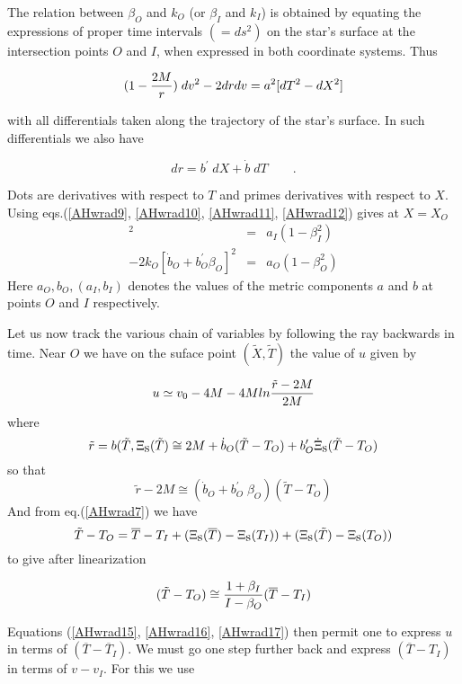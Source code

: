 \documentclass[12pt,oneside]{report}
\def\beq {\begin{equation}}
\def\feq {\end{equation}}
\begin{document}
The relation between $ \beta_O $ and $ k_O$ (or $ \beta_I $
and $ k_I$) is obtained by equating the expressions  of proper time intervals
$(= ds^2)$  on the star's surface at the intersection
points $O$ and $I$, when expressed in both coordinate
systems. Thus

\beq (1 - {2 M \over r})\; dv^2 - 2 dr dv = a^2 [ d T^2 - d X^2
] \label{AHwrad11} \feq

\noindent with all differentials taken along the trajectory of
the star's surface. In such differentials we also have

\beq dr = b^\prime \; d X + {\dot b}\; d T \qquad .\label{AHwrad12} \feq

\noindent Dots are derivatives with respect to $T$ and primes derivatives 
with respect
to $X$. Using eqs.(\ref{AHwrad9}, \ref{AHwrad10}, \ref{AHwrad11}, \ref{AHwrad12}) gives
at $X = X_O$ 
\begin{eqnarray}
[ ( 1 - {2 M \over r_I}) \; k_I ^2 -  2 k_I ] [ {\dot b}_I +
b_I ^\prime \beta_I ]^2 &= &a_I (1 - \beta_I ^2 ) \label{AHwrad13} \\
-  2 k_O [ {\dot b}_O + b_O ^\prime \beta_O ] ^2& =& a_O (1 -
\beta_O^2)  \label{AHwrad14} 
\end{eqnarray}
\noindent Here $  a_O, b_O, (a_I, b_I)$ denotes the values of the metric components
$a$ and $b$ at points $O$ and $I$ respectively.

Let us now track the various chain of variables by following
the ray backwards in time. Near $O$ we have on the suface point
$ (\tilde X, \tilde T)$ the value of $u$ given by

\beq  u \simeq v_0 - 4 M - 4 M ln {\tilde r - 2 M \over 2 M}
\label{AHwrad15} \feq
\noindent where
$$  {\tilde r} = b ( {\tilde T}, \Xi_{\mbox{\rm s}} ({\tilde T}) \cong
2 M + \dot b_O ({\tilde T} - T_O) + b^\prime _O \dot \Xi_{\mbox{\rm s}} ({\tilde
T} - T_O) \nonumber $$
\noindent so that
\beq  {\tilde r} - 2 M \cong ({\dot b}_O + b^\prime _O \;\beta_O) (
{\tilde T} - T_O) \label{AHwrad16} \feq
\noindent And from eq.(\ref{AHwrad7}) we have
\beq  {\tilde T} - T_O = {\overline T} - T_I + ( \Xi_{\mbox{\rm s}}
({\overline T}) - \Xi_{\mbox{\rm s}} (T_I)) + (\Xi_{\mbox{\rm s}} ({\tilde T}) -
\Xi_{\mbox{\rm s}} (T_O)) \nonumber \feq
\noindent to give after linearization

\beq  ({\tilde T} - T_O) \cong {1 + \beta_I \over I - \beta_O}
({\overline T} - T_I) \label{AHwrad17} \feq



\noindent Equations (\ref{AHwrad15}, \ref{AHwrad16}, \ref{AHwrad17}) then permit
one to express $u$ in terms of $( {\overline T} - {\overline T}_I)$. We
must go one step further back and express $ ({\overline T} -
T_I)$ in terms of $ v - v_I$. For this we use 
\end{document}

